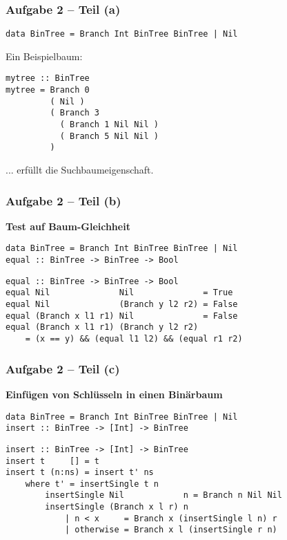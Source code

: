 \documentclass{beamer}
\begin{document}
\begin{frame}[t, fragile] \frametitle{Aufgabe 2 -- Teil (a)}
	\begin{lstlisting}[style=bg]
data BinTree = Branch Int BinTree BinTree | Nil
	\end{lstlisting}
	\pause
	
	Ein Beispielbaum: \\[6pt]
	\begin{lstlisting}[style=bg]
mytree :: BinTree 
mytree = Branch 0 
         ( Nil )
         ( Branch 3 
           ( Branch 1 Nil Nil )
           ( Branch 5 Nil Nil )
         )
	\end{lstlisting}
	... erfüllt die Suchbaumeigenschaft.
\end{frame}

\begin{frame}[t, fragile] \frametitle{Aufgabe 2 -- Teil (b)}
	\textbf{Test auf Baum-Gleichheit}
	
	\pause
	
	\begin{lstlisting}[style=bg]
data BinTree = Branch Int BinTree BinTree | Nil
equal :: BinTree -> BinTree -> Bool
	\end{lstlisting}
	
	\bigskip \pause
	
	\begin{lstlisting}[style=bg]
equal :: BinTree -> BinTree -> Bool
equal Nil              Nil              = True
equal Nil              (Branch y l2 r2) = False
equal (Branch x l1 r1) Nil              = False
equal (Branch x l1 r1) (Branch y l2 r2)
	= (x == y) && (equal l1 l2) && (equal r1 r2)
	\end{lstlisting}
\end{frame}

\begin{frame}[t, fragile] \frametitle{Aufgabe 2 -- Teil (c)}
	\textbf{Einfügen von Schlüsseln in einen Binärbaum}
	
	\begin{lstlisting}[style=bg]
data BinTree = Branch Int BinTree BinTree | Nil 
insert :: BinTree -> [Int] -> BinTree
	\end{lstlisting}
	
	\bigskip \pause
	
	\begin{lstlisting}[style=bg]
insert :: BinTree -> [Int] -> BinTree
insert t     [] = t
insert t (n:ns) = insert t' ns
    where t' = insertSingle t n
        insertSingle Nil            n = Branch n Nil Nil
        insertSingle (Branch x l r) n
            | n < x     = Branch x (insertSingle l n) r
            | otherwise = Branch x l (insertSingle r n)
	\end{lstlisting}
\end{frame}
\end{document}

